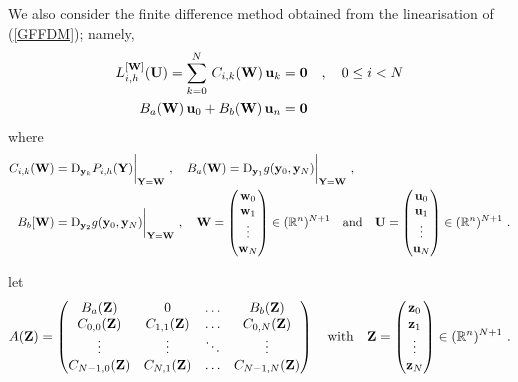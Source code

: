 We also consider the finite difference method obtained from the
linearisation of (\ref{GFFDM}); namely,
\begin{equation} \label{LinGFFDM}
\begin{split}
L^{[\mathbf{W}]}_{i,h} (\mathbf{U}) =
\sum_{k=0}^N\,C_{i,k}(\mathbf{W})\,\mathbf{u}_k &= \mathbf{0} \quad , \quad
0 \leq i < N \\
B_a(\mathbf{W}) \,\mathbf{u}_0 + B_b(\mathbf{W})\,\mathbf{u}_n &= \mathbf{0}
\end{split}
\end{equation}
where
\begin{align*}
C_{i,k}(\mathbf{W})  &= \mathrm{D}_{\mathbf{y}_k} P_{i,h}(\mathbf{Y})\bigg|_{\mathbf{Y}=\mathbf{W}}
\ , \quad
B_a(\mathbf{W}) = \mathrm{D}_{\mathbf{y}_1} g(\mathbf{y}_0,\mathbf{y}_N)\bigg|_{\mathbf{Y}=\mathbf{W}}
\ ,  \\
B_b[\mathbf{W}) &= \mathrm{D}_{\mathbf{y}_2} g(\mathbf{y}_0,\mathbf{y}_N)\bigg|_{\mathbf{Y}=\mathbf{W}}
\ , \quad
\mathbf{W} = \begin{pmatrix} \mathbf{w}_0 \\
\mathbf{w}_1 \\ \vdots \\ \mathbf{w}_N \end{pmatrix} \in (\mathbb{R}^n)^{N+1} \quad
\text{and} \quad
\mathbf{U} = \begin{pmatrix} \mathbf{u}_0 \\
\mathbf{u}_1 \\ \vdots \\ \mathbf{u}_N \end{pmatrix} \in (\mathbb{R}^n)^{N+1} \ .
\end{align*}

let
\[
A(\mathbf{Z}) = \begin{pmatrix}
B_a(\mathbf{Z}) & 0 & \ldots & B_b(\mathbf{Z}) \\
C_{0,0}(\mathbf{Z}) & C_{1,1}(\mathbf{Z}) & \ldots & C_{0,N}(\mathbf{Z}) \\
\vdots & \vdots & \ddots & \vdots \\
C_{N-1,0}(\mathbf{Z}) & C_{N,1}(\mathbf{Z}) & \ldots & C_{N-1,N}(\mathbf{Z})
\end{pmatrix} \quad \text{with} \quad
\mathbf{Z} = \begin{pmatrix} \mathbf{z}_0 \\ \mathbf{z}_1\\
\vdots \\ \mathbf{z}_N \end{pmatrix} \in (\mathbb{R}^n)^{N+1} \ .
\]

